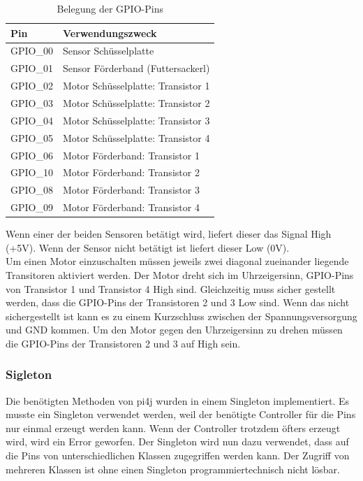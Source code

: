 \newpage

\begin{table}[]
\centering
\caption{Belegung der GPIO-Pins}
\label{my-label}
\begin{tabular}{|l|l|}
\hline
\textbf{Pin} & \textbf{Verwendungszweck}          \\ \hline
GPIO\_00     & Sensor Schüsselplatte              \\ \hline
GPIO\_01     & Sensor Förderband (Futtersackerl)  \\ \hline
GPIO\_02     & Motor Schüsselplatte: Transistor 1 \\ \hline
GPIO\_03     & Motor Schüsselplatte: Transistor 2 \\ \hline
GPIO\_04     & Motor Schüsselplatte: Transistor 3 \\ \hline
GPIO\_05     & Motor Schüsselplatte: Transistor 4 \\ \hline
GPIO\_06     & Motor Förderband: Transistor 1     \\ \hline
GPIO\_10     & Motor Förderband: Transistor 2     \\ \hline
GPIO\_08     & Motor Förderband: Transistor 3     \\ \hline
GPIO\_09     & Motor Förderband: Transistor 4     \\ \hline
\end{tabular}
\end{table}

Wenn einer der beiden Sensoren betätigt wird, liefert dieser das Signal High (+5V). Wenn der Sensor nicht betätigt ist liefert dieser Low (0V). 
\\ Um einen Motor einzuschalten müssen jeweils zwei diagonal zueinander liegende Transitoren aktiviert werden. Der Motor dreht sich im Uhrzeigersinn, GPIO-Pins von Transistor 1 und Transistor 4 High sind. Gleichzeitig muss sicher gestellt werden, dass die GPIO-Pins der Transistoren 2 und 3 Low sind. Wenn das nicht sichergestellt ist kann es zu einem Kurzschluss zwischen der Spannungsversorgung und GND kommen. Um den Motor gegen den Uhrzeigersinn zu drehen müssen die GPIO-Pins der Transistoren 2 und 3 auf High sein. 

\subsubsection{Sigleton}
Die benötigten Methoden von pi4j wurden in einem Singleton implementiert. Es musste ein Singleton verwendet werden, weil der benötigte Controller für die Pins nur einmal erzeugt werden kann. Wenn der Controller trotzdem öfters erzeugt wird, wird  ein Error geworfen. Der Singleton wird nun dazu verwendet, dass auf die Pins von unterschiedlichen Klassen zugegriffen werden kann. Der Zugriff von mehreren Klassen ist ohne einen Singleton programmiertechnisch nicht lösbar.

